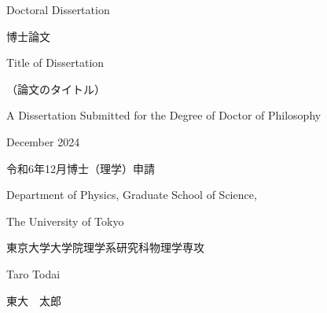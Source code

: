 \documentclass[12pt, a4paper, openright, twoside]{book}
\begin{document}
  \begin{center}
    \Large Doctoral Dissertation \par
    \Large 博士論文 \par
    \vspace{15mm}
    \Large Title of Dissertation \par
    \vspace{5mm}
    \large （論文のタイトル） \par
    \vspace{15mm}
    \Large A Dissertation Submitted for the Degree of Doctor of Philosophy \par
    \Large December 2024 \par
    \Large 令和6年12月博士（理学）申請 \par
    \vspace{15mm}
    \Large  Department of Physics, Graduate School of Science, \par
    \Large The University of Tokyo \par
    \Large 東京大学大学院理学系研究科物理学専攻 \par
    \vspace{15mm}
    \Large Taro Todai \par
    \Large 東大　太郎
  \end{center}
  \thispagestyle{empty}
\end{document}
